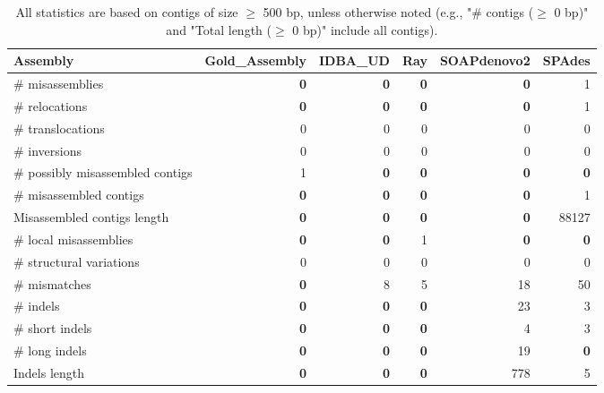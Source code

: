 \documentclass[12pt,a4paper]{article}
\begin{document}
\begin{table}[ht]
\begin{center}
\caption{All statistics are based on contigs of size $\geq$ 500 bp, unless otherwise noted (e.g., "\# contigs ($\geq$ 0 bp)" and "Total length ($\geq$ 0 bp)" include all contigs).}
\begin{tabular}{|l*{5}{|r}|}
\hline
Assembly & Gold\_Assembly & IDBA\_UD & Ray & SOAPdenovo2 & SPAdes \\ \hline
\# misassemblies & {\bf 0} & {\bf 0} & {\bf 0} & {\bf 0} & 1 \\ \hline
\hspace{5mm}\# relocations & {\bf 0} & {\bf 0} & {\bf 0} & {\bf 0} & 1 \\ \hline
\hspace{5mm}\# translocations & 0 & 0 & 0 & 0 & 0 \\ \hline
\hspace{5mm}\# inversions & 0 & 0 & 0 & 0 & 0 \\ \hline
\# possibly misassembled contigs & 1 & {\bf 0} & {\bf 0} & {\bf 0} & {\bf 0} \\ \hline
\# misassembled contigs & {\bf 0} & {\bf 0} & {\bf 0} & {\bf 0} & 1 \\ \hline
Misassembled contigs length & {\bf 0} & {\bf 0} & {\bf 0} & {\bf 0} & 88127 \\ \hline
\# local misassemblies & {\bf 0} & {\bf 0} & 1 & {\bf 0} & {\bf 0} \\ \hline
\# structural variations & 0 & 0 & 0 & 0 & 0 \\ \hline
\# mismatches & {\bf 0} & 8 & 5 & 18 & 50 \\ \hline
\# indels & {\bf 0} & {\bf 0} & {\bf 0} & 23 & 3 \\ \hline
\hspace{5mm}\# short indels & {\bf 0} & {\bf 0} & {\bf 0} & 4 & 3 \\ \hline
\hspace{5mm}\# long indels & {\bf 0} & {\bf 0} & {\bf 0} & 19 & {\bf 0} \\ \hline
Indels length & {\bf 0} & {\bf 0} & {\bf 0} & 778 & 5 \\ \hline
\end{tabular}
\end{center}
\end{table}
\end{document}
